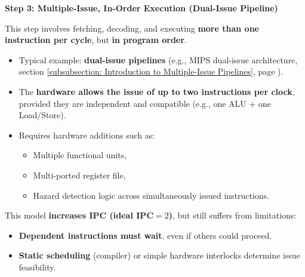 \begin{flushleft}
    \textcolor{Green3}{ \textbf{Step 3: Multiple-Issue, In-Order Execution (Dual-Issue Pipeline)}}
\end{flushleft}
This step involves fetching, decoding, and executing \textbf{more than one instruction per cycle}, but \textbf{in program order}.
\begin{itemize}
    \item Typical example: \textbf{dual-issue pipelines} (e.g., MIPS dual-issue architecture, section \ref{subsubsection: Introduction to Multiple-Issue Pipelines}, page \pageref{subsubsection: Introduction to Multiple-Issue Pipelines}).
    \item The \textbf{hardware allows the issue of up to two instructions per clock}, provided they are independent and compatible (e.g., one ALU $+$ one Load/Store).
    \item Requires hardware additions such as:
    \begin{itemize}
        \item Multiple functional units,
        \item Multi-ported register file,
        \item Hazard detection logic across simultaneously issued instructions.
    \end{itemize}
\end{itemize}
This model \textcolor{Green3}{\textbf{increases IPC (ideal $\mathbf{IPC} = 2$)}}, but still suffers from limitations:
\begin{itemize}[label=\textcolor{Red2}{}]
    \item \textcolor{Red2}{\textbf{Dependent instructions must wait}}, even if others could proceed.
    \item \textcolor{Red2}{\textbf{Static scheduling}} (compiler) or simple hardware interlocks determine issue feasibility.
\end{itemize}

